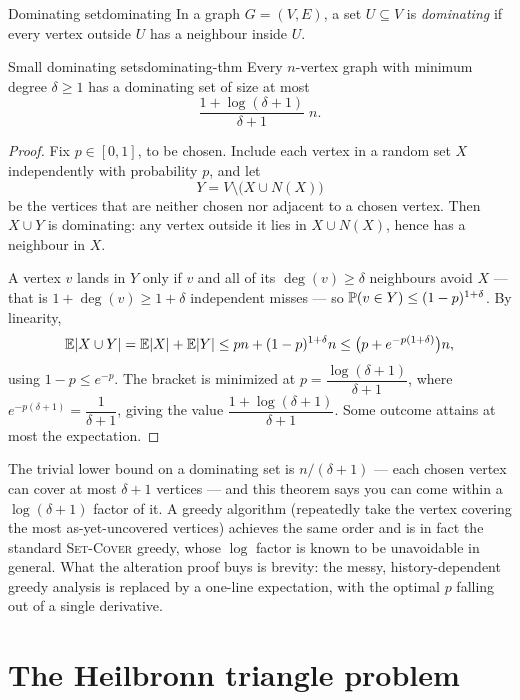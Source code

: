 \begin{definition}{Dominating set}{dominating}
In a graph $G=(V,E)$, a set $U\subseteq V$ is \emph{dominating} if every vertex
outside $U$ has a neighbour inside $U$.
\end{definition}

\begin{theorem}{Small dominating sets}{dominating-thm}
Every $n$-vertex graph with minimum degree $\delta\ge1$ has a dominating set of
size at most
\[
  \frac{1+\log(\delta+1)}{\delta+1}\;n.
\]
\end{theorem}

\begin{proof}
Fix $p\in[0,1]$, to be chosen. Include each vertex in a random set $X$
independently with probability $p$, and let
\[
  Y = V\setminus\bigl(X\cup N(X)\bigr)
\]
be the vertices that are neither chosen nor adjacent to a chosen vertex. Then
$X\cup Y$ is dominating: any vertex outside it lies in $X\cup N(X)$, hence has a
neighbour in $X$.

A vertex $v$ lands in $Y$ only if $v$ and all of its $\deg(v)\ge\delta$
neighbours avoid $X$ --- that is $1+\deg(v)\ge1+\delta$ independent misses --- so
$\mathbb{P}(v\in Y)\le(1-p)^{1+\delta}$. By linearity,
\[
  \mathbb{E}|X\cup Y| = \mathbb{E}|X|+\mathbb{E}|Y|
  \le pn + (1-p)^{1+\delta}n
  \le \bigl(p + e^{-p(1+\delta)}\bigr)n,
\]
using $1-p\le e^{-p}$. The bracket is minimized at
$p=\dfrac{\log(\delta+1)}{\delta+1}$, where $e^{-p(\delta+1)}=\dfrac{1}{\delta+1}$,
giving the value $\dfrac{1+\log(\delta+1)}{\delta+1}$. Some outcome attains at
most the expectation.
\end{proof}

\begin{insight}
The trivial lower bound on a dominating set is $n/(\delta+1)$ --- each chosen
vertex can cover at most $\delta+1$ vertices --- and this theorem says you can
come within a $\log(\delta+1)$ factor of it. A greedy algorithm (repeatedly
take the vertex covering the most as-yet-uncovered vertices) achieves the same
order and is in fact the standard \textsc{Set-Cover} greedy, whose
$\log$ factor is known to be unavoidable in general. What the alteration proof
buys is brevity: the messy, history-dependent greedy analysis is replaced by a
one-line expectation, with the optimal $p$ falling out of a single derivative.
\end{insight}

\section{The Heilbronn triangle problem}

